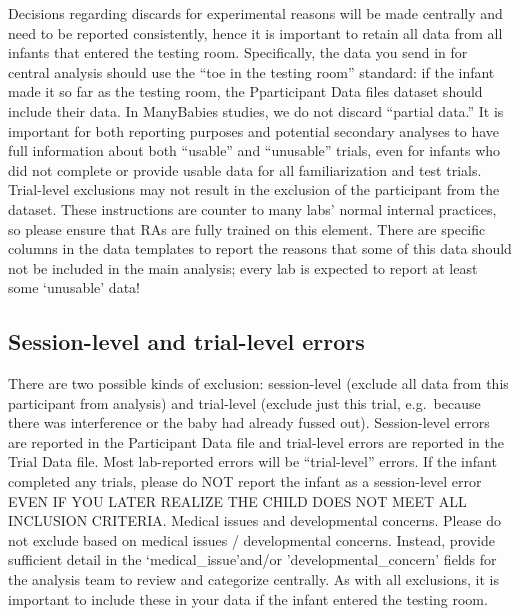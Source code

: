 \documentclass[
]{book}
\begin{document}
Decisions regarding discards for experimental reasons will be made centrally and need to be reported consistently, hence it is important to retain all data from all infants that entered the testing room. Specifically, the data you send in for central analysis should use the ``toe in the testing room'' standard: if the infant made it so far as the testing room, the Pparticipant Data files dataset should include their data.
In ManyBabies studies, we do not discard ``partial data.'' It is important for both reporting purposes and potential secondary analyses to have full information about both ``usable'' and ``unusable'' trials, even for infants who did not complete or provide usable data for all familiarization and test trials. Trial-level exclusions may not result in the exclusion of the participant from the dataset.
These instructions are counter to many labs' normal internal practices, so please ensure that RAs are fully trained on this element. There are specific columns in the data templates to report the reasons that some of this data should not be included in the main analysis; every lab is expected to report at least some `unusable' data!

\hypertarget{session-level-and-trial-level-errors}{%
\subsection{Session-level and trial-level errors}\label{session-level-and-trial-level-errors}}

There are two possible kinds of exclusion: session-level (exclude all data from this participant from analysis) and trial-level (exclude just this trial, e.g.~because there was interference or the baby had already fussed out). Session-level errors are reported in the Participant Data file and trial-level errors are reported in the Trial Data file. Most lab-reported errors will be ``trial-level'' errors.
If the infant completed any trials, please do NOT report the infant as a session-level error EVEN IF YOU LATER REALIZE THE CHILD DOES NOT MEET ALL INCLUSION CRITERIA.
Medical issues and developmental concerns. Please do not exclude based on medical issues / developmental concerns. Instead, provide sufficient detail in the `medical\_issue'and/or 'developmental\_concern' fields for the analysis team to review and categorize centrally. As with all exclusions, it is important to include these in your data if the infant entered the testing room.
\end{document}
